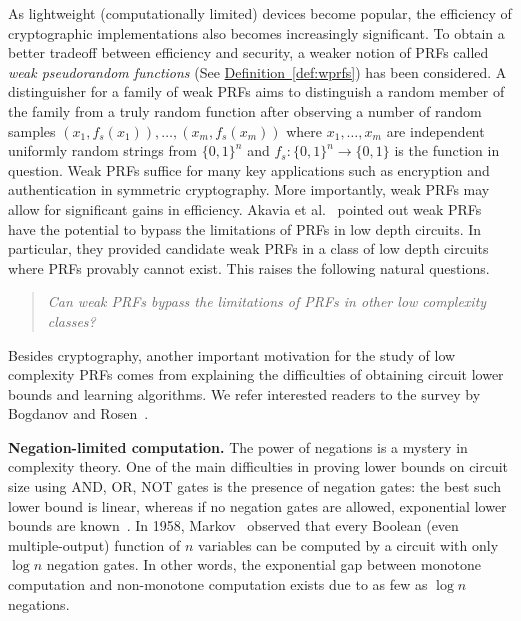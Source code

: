 \documentclass[11pt]{article}
\numberwithin{equation}{section}
\theoremstyle{definition}
\theoremstyle{plain}
\newcommand{\expref}[2]{\hyperref[#2]{#1~\ref{#2}}}
\begin{document}
As lightweight (computationally limited) devices become popular, the efficiency of cryptographic implementations
also %
becomes %
increasingly significant.  To obtain a better tradeoff between efficiency and security, a weaker notion of PRFs called \emph{weak pseudorandom functions} (See \expref{Definition}{def:wprfs}) has been considered. A distinguisher for a 
family of %
weak PRFs aims to distinguish a random member of the family from a truly random function after observing a number of random samples $(x_1,f_s(x_1)),\dots, (x_m,f_s(x_m))$ where $x_1,\dots,x_m$ are independent uniformly random strings from $\{0,1\}^n$ and $f_s:\{0,1\}^n\rightarrow\{0,1\}$ is the function in question. Weak PRFs suffice for many key applications such as encryption and authentication in symmetric cryptography. More importantly, weak PRFs may allow for significant gains in efficiency.  Akavia et al.~\cite{ABGKM14} pointed out weak PRFs have the potential to bypass the limitations of PRFs in low depth circuits. In particular, they provided candidate weak PRFs in a class of low depth circuits where PRFs provably cannot exist. This raises the following natural questions.
\begin{quote} {\it
Can weak PRFs bypass the limitations of PRFs in other low complexity classes? }
\end{quote}

Besides cryptography, another important motivation for the study of low complexity PRFs comes from explaining the difficulties of obtaining circuit lower bounds and learning algorithms. We refer interested readers to the survey by Bogdanov and Rosen~\cite{BR17}. 


\vspace{2ex}
%
\noindent\textbf{Negation-limited computation.} %
The power of negations is a mystery in complexity theory. One of the main difficulties in proving lower bounds on circuit size using AND, OR, NOT gates is the presence of negation gates: the best such lower bound is linear, whereas if no negation gates are allowed, exponential lower bounds are known~\cite{razborov1985lower,andreev1985method,alon1987monotone,tardos1988gap,berg1999symmetric,harnik2000higher}. In 1958, Markov~\cite{Mark} observed that every Boolean (even multiple-output) function of $n$ variables can be computed by a circuit with only $\log{n}$ negation gates.  In other words, the 
%
%
exponential gap between monotone computation and non-monotone computation exists due to as few as $\log{n}$ negations.
\end{document}
